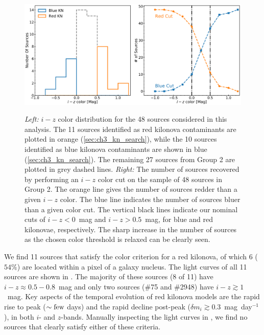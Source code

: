 \begin{figure}[!t]
\begin{center}
\hspace*{-0.1in}
\scalebox{1.}
{\includegraphics[width=\textwidth]{./figs/chapter3/f3.pdf}}
\caption{{\it Left:} $i-z$ color distribution for the 48 sources considered in this analysis. The 11 sources identified as red kilonova contaminants are plotted in orange (\cref{sec:ch3_kn_search}), while the 10 sources identified as blue kilonova contaminants are shown in blue (\cref{sec:ch3_kn_search}). The remaining 27 sources from Group 2 are plotted in grey dashed lines.
{\it Right:} The number of sources recovered by performing an $i-z$ color cut on the sample of 48 sources in Group 2. The orange line gives the number of sources redder than a given $i-z$ color. The blue line indicates the number of sources bluer than a given color cut. The vertical black lines indicate our nominal cuts of $i-z < 0$~mag and $i-z > 0.5$~mag, for blue and red kilonovae, respectively. The sharp increase in the number of sources as the chosen color threshold is relaxed can be clearly seen.}
\label{fig:ch3_color_dist_final}
\end{center}
\end{figure}

We find 11 sources that satisfy the color criterion for a red kilonova, of which 6 ($54\%$) are located within a pixel of a galaxy nucleus.  The light curves of all 11 sources are shown in . The majority of these sources (8 of 11) have $i-z \approx 0.5-0.8$~mag and only two sources (\#75 and \#2948) have $i-z \gtrsim 1$~mag. Key aspects of the temporal evolution of red kilonova models are the rapid rise to peak ($\sim \rm few$ days) and the rapid decline post-peak ($\delta m_i \gtrsim 0.3$~mag~day$^{-1}$), in both $i$- and $z$-bands. Manually inspecting the light curves in , we find no sources that clearly satisfy either of these criteria.

